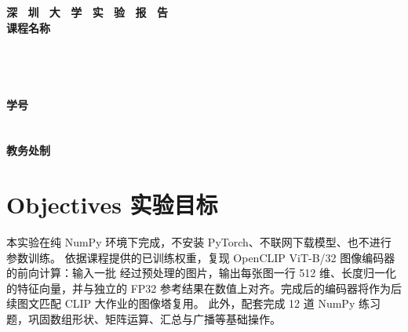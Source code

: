 \documentclass[a4paper,12pt]{article}
\begin{document}
\begin{titlepage}
    \centering
    \vspace*{2cm}
    \Huge{\textbf{深 \ 圳 \ 大 \ 学 \ 实 \ 验  \ 报 \ 告}}\\[1.5cm]

    {\Large\textbf{课程名称}\quad\underline{}}\\[0.5cm]
{\Large
\noindent{}
\underline{}}\\[0.5cm]
{\Large
\noindent{}
\underline{}}\\[0.5cm]
{\Large
\noindent{}
\underline{}}\\[0.5cm]
{\Large
\noindent{}
\underline{}}\\[0.5cm]
{\Large
\noindent{}
\underline{}
\hspace{0.5cm}
\textbf{学号}
\underline{}}\\[0.5cm]
{\Large
\noindent{}
\underline{}}\\[0.5cm]
{\Large
\noindent{}
\underline{}}\\[1.5cm]

    \vfill
    \Large{\textbf{教务处制}}
\end{titlepage}

\newpage


\section{Objectives 实验目标}

本实验在纯 NumPy 环境下完成，不安装 PyTorch、不联网下载模型、也不进行参数训练。
依据课程提供的已训练权重，复现 OpenCLIP ViT-B/32 图像编码器的前向计算：输入一批
经过预处理的图片，输出每张图一行 512 维、长度归一化的特征向量，并与独立的 FP32
参考结果在数值上对齐。完成后的编码器将作为后续图文匹配 CLIP 大作业的图像塔复用。
此外，配套完成 12 道 NumPy 练习题，巩固数组形状、矩阵运算、汇总与广播等基础操作。
\end{document}
